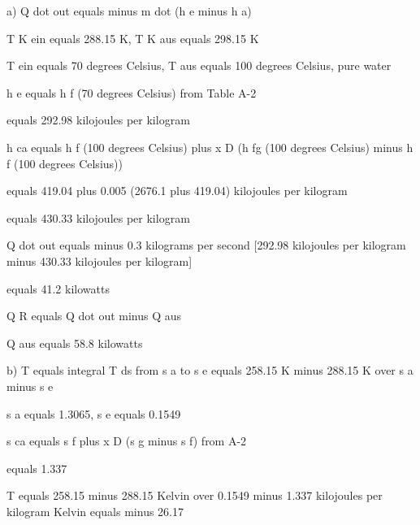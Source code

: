 a) Q dot out equals minus m dot (h e minus h a)

T K ein equals 288.15 K, T K aus equals 298.15 K

T ein equals 70 degrees Celsius, T aus equals 100 degrees Celsius, pure water

h e equals h f (70 degrees Celsius) from Table A-2

equals 292.98 kilojoules per kilogram

h ca equals h f (100 degrees Celsius) plus x D (h fg (100 degrees Celsius) minus h f (100 degrees Celsius))

equals 419.04 plus 0.005 (2676.1 plus 419.04) kilojoules per kilogram

equals 430.33 kilojoules per kilogram

Q dot out equals minus 0.3 kilograms per second [292.98 kilojoules per kilogram minus 430.33 kilojoules per kilogram]

equals 41.2 kilowatts

Q R equals Q dot out minus Q aus

Q aus equals 58.8 kilowatts

b) T equals integral T ds from s a to s e equals 258.15 K minus 288.15 K over s a minus s e

s a equals 1.3065, s e equals 0.1549

s ca equals s f plus x D (s g minus s f) from A-2

equals 1.337

T equals 258.15 minus 288.15 Kelvin over 0.1549 minus 1.337 kilojoules per kilogram Kelvin equals minus 26.17